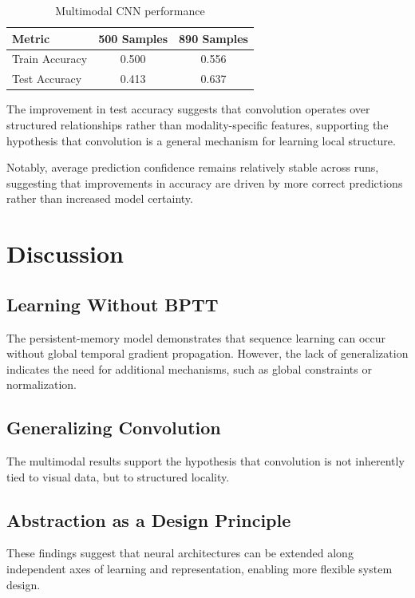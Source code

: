 \documentclass{article}
\begin{document}
	\begin{table}[h]
		\centering
		\begin{tabular}{lcc}
			\toprule
			Metric & 500 Samples & 890 Samples \\
			\midrule
			Train Accuracy & 0.500 & 0.556 \\
			Test Accuracy & 0.413 & 0.637 \\
			\bottomrule
		\end{tabular}
		\caption{Multimodal CNN performance}
	\end{table}
	
The improvement in test accuracy suggests that convolution operates over structured relationships rather than modality-specific features, supporting the hypothesis that convolution is a general mechanism for learning local structure.
	
	Notably, average prediction confidence remains relatively stable across runs, suggesting that improvements in accuracy are driven by more correct predictions rather than increased model certainty.
	\section{Discussion}
	
	\subsection{Learning Without BPTT}
	
	The persistent-memory model demonstrates that sequence learning can occur without global temporal gradient propagation. However, the lack of generalization indicates the need for additional mechanisms, such as global constraints or normalization.
	
	\subsection{Generalizing Convolution}
	
	The multimodal results support the hypothesis that convolution is not inherently tied to visual data, but to structured locality.
	
	\subsection{Abstraction as a Design Principle}
	
	These findings suggest that neural architectures can be extended along independent axes of learning and representation, enabling more flexible system design.
	
\end{document}
